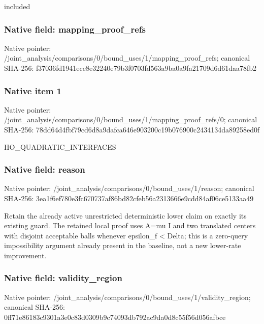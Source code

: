 \documentclass[10pt,a4paper]{article}
\begin{document}
\begingroup\raggedright\sloppy included\par\endgroup

\subsubsection{Native field: mapping\_\allowbreak{}proof\_\allowbreak{}refs}
Native pointer: /joint\_\allowbreak{}analysis/comparisons/0/bound\_\allowbreak{}uses/1/mapping\_\allowbreak{}proof\_\allowbreak{}refs; canonical SHA-256: f37036fd1941ece8e32240e79b3f0703fd563a9ba0a9fa21709d6d61daa78fb2

\subsubsection{Native item 1}
Native pointer: /joint\_\allowbreak{}analysis/comparisons/0/bound\_\allowbreak{}uses/1/mapping\_\allowbreak{}proof\_\allowbreak{}refs/0; canonical SHA-256: 78dd64d4fbf79cd6d8a9dafca646e903200c19b076900c2434134da89258ed0f

\begingroup\raggedright\sloppy HO\_\allowbreak{}QUADRATIC\_\allowbreak{}INTERFACES\par\endgroup

\subsubsection{Native field: reason}
Native pointer: /joint\_\allowbreak{}analysis/comparisons/0/bound\_\allowbreak{}uses/1/reason; canonical SHA-256: 3ea1f6ef780e3fc670737af86bd82cfeb56a2313666e9cdd84af06ce5133aa49

\begingroup\raggedright\sloppy Retain the already active unrestricted deterministic lower claim on exactly its existing guard. The retained local proof uses A=\allowbreak{}mu I and two translated centers with disjoint acceptable balls whenever epsilon\_\allowbreak{}f < Delta;\allowbreak{} this is a zero-query impossibility argument already present in the baseline,\allowbreak{} not a new lower-rate improvement.\par\endgroup

\subsubsection{Native field: validity\_\allowbreak{}region}
Native pointer: /joint\_\allowbreak{}analysis/comparisons/0/bound\_\allowbreak{}uses/1/validity\_\allowbreak{}region; canonical SHA-256: 0ff71e86183c9301a3e0c83d0309b9c74093db792ac9da0d8c55f56d056afbce
\end{document}
